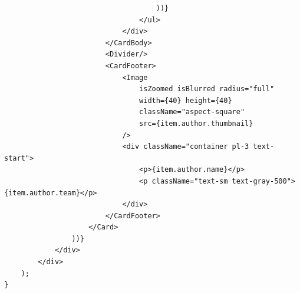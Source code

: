 \documentclass[master, och, diploma]{SCWorks}
\begin{document}
\begin{verbatim}
                                    ))}
                                </ul>
                            </div>
                        </CardBody>
                        <Divider/>
                        <CardFooter>
                            <Image
                                isZoomed isBlurred radius="full"
                                width={40} height={40}
                                className="aspect-square"
                                src={item.author.thumbnail}
                            />
                            <div className="container pl-3 text-start">
                                <p>{item.author.name}</p>
                                <p className="text-sm text-gray-500">{item.author.team}</p>
                            </div>
                        </CardFooter>
                    </Card>
                ))}
            </div>
        </div>
    );
}
\end{verbatim}
\end{document}
